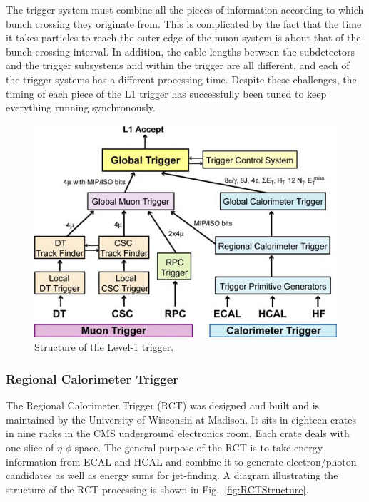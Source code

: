 The trigger system must combine all the pieces of information 
according to which bunch crossing they originate from.   
This is complicated by the fact that the time it takes particles 
to reach the outer edge of the muon system 
is about that of the bunch crossing interval.  
In addition, the cable lengths between the subdetectors 
and the trigger subsystems and within the trigger are 
all different, 
and each of the trigger systems has a different processing time.  
Despite these challenges, the timing of each piece of 
the L1 trigger has successfully been tuned to keep everything running 
synchronously.  



 \begin{figure}[htb]
  \begin{center}
    \includegraphics[width=360pt]{Figures/L1structure.png}
  \end{center}
  \caption[\fixspacing Structure of the Level-1 trigger]
	  {\fixspacing Structure of the Level-1 trigger.}
  \label{fig:L1Structure}
 \end{figure}

\subsubsection{Regional Calorimeter Trigger}
\label{exp:RCT}
The Regional Calorimeter Trigger (RCT) \cite{rctTriggerSystem}
was designed and built and is maintained 
by the University of Wisconsin at Madison.  
It sits in eighteen crates in nine racks in the CMS underground electronics room.  
Each crate deals with one slice of $\eta$-$\phi$ space.  
The general purpose of the RCT is to take 
energy information from ECAL and HCAL and combine it 
to generate electron/photon candidates as well as energy sums for 
jet-finding.  
A diagram illustrating the structure of the RCT processing 
is shown in Fig.~\ref{fig:RCTStructure}.  

